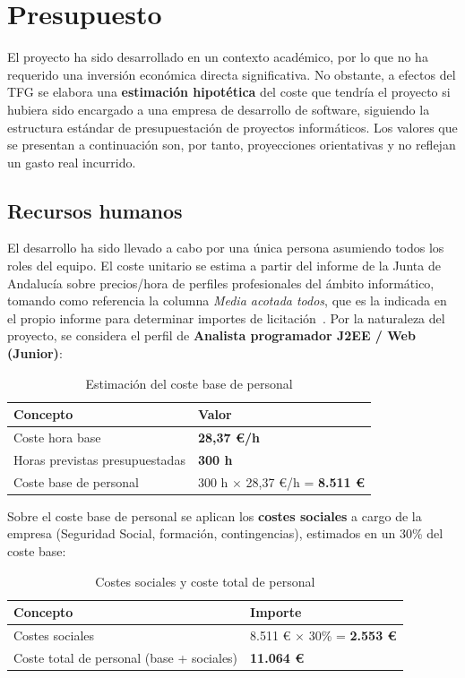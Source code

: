 \section{Presupuesto}

El proyecto ha sido desarrollado en un contexto académico, por lo que no ha requerido una inversión económica directa significativa. No obstante, a efectos del TFG se elabora una \textbf{estimación hipotética} del coste que tendría el proyecto si hubiera sido encargado a una empresa de desarrollo de software, siguiendo la estructura estándar de presupuestación de proyectos informáticos. Los valores que se presentan a continuación son, por tanto, proyecciones orientativas y no reflejan un gasto real incurrido.

\subsection{Recursos humanos}

El desarrollo ha sido llevado a cabo por una única persona asumiendo todos los roles del equipo. El coste unitario se estima a partir del informe de la Junta de Andalucía sobre precios/hora de perfiles profesionales del ámbito informático, tomando como referencia la columna \textit{Media acotada todos}, que es la indicada en el propio informe para determinar importes de licitación~\cite{junta2018perfiles}. Por la naturaleza del proyecto, se considera el perfil de \textbf{Analista programador J2EE / Web (Junior)}:

\begin{table}[H]
\centering
\caption{Estimación del coste base de personal}
\label{tab:coste_base_personal}
\begin{tabular}{p{7cm}p{5cm}}
\toprule
\textbf{Concepto} & \textbf{Valor} \\
\midrule
Coste hora base & \textbf{28,37 €/h} \\
Horas previstas presupuestadas & \textbf{300 h} \\
Coste base de personal & 300 h $\times$ 28,37 €/h = \textbf{8.511 €} \\
\bottomrule
\end{tabular}
\end{table}

Sobre el coste base de personal se aplican los \textbf{costes sociales} a cargo de la empresa (Seguridad Social, formación, contingencias), estimados en un 30\% del coste base:

\begin{table}[H]
\centering
\caption{Costes sociales y coste total de personal}
\label{tab:costes_sociales_personal}
\begin{tabular}{p{7cm}p{5cm}}
\toprule
\textbf{Concepto} & \textbf{Importe} \\
\midrule
Costes sociales & 8.511 € $\times$ 30\% = \textbf{2.553 €} \\
Coste total de personal (base + sociales) & \textbf{11.064 €} \\
\bottomrule
\end{tabular}
\end{table}

